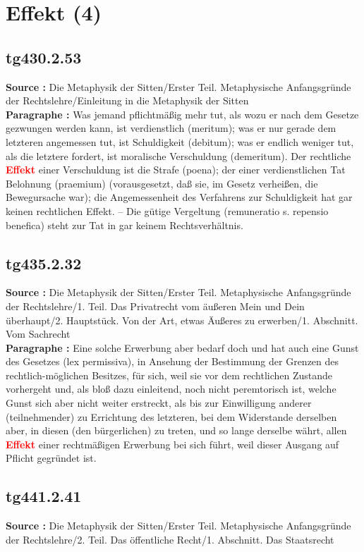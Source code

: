 \documentclass[a4paper,12pt,twoside]{book}
\newcommand{\match}[1]{\textcolor{red}{\textbf{#1}}}
\newcommand{\unnumberedsection}[1]{
	\section*{#1}
	\addcontentsline{toc}{section}{#1}
	\markright{#1}
}
\begin{document}
	\unnumberedsection{Effekt (4)} 
	\subsection*{tg430.2.53} 
	\textbf{Source : }Die Metaphysik der Sitten/Erster Teil. Metaphysische Anfangsgründe der Rechtslehre/Einleitung in die Metaphysik der Sitten\\  
	
	\textbf{Paragraphe : }Was jemand pflichtmäßig mehr tut, als wozu er nach dem Gesetze gezwungen werden kann, ist verdienstlich (meritum); was er nur gerade dem letzteren angemessen tut, ist Schuldigkeit (debitum); was er endlich weniger tut, als die letztere fordert, ist moralische Verschuldung (demeritum). Der rechtliche \match{Effekt} einer Verschuldung ist die Strafe (poena); der einer verdienstlichen Tat Belohnung (praemium) (vorausgesetzt, daß sie, im Gesetz verheißen, die Bewegursache war); die Angemessenheit des Verfahrens zur Schuldigkeit hat gar keinen rechtlichen Effekt. – Die gütige Vergeltung (remuneratio s. repensio benefica) steht zur Tat in gar keinem Rechtsverhältnis. 
	
	\subsection*{tg435.2.32} 
	\textbf{Source : }Die Metaphysik der Sitten/Erster Teil. Metaphysische Anfangsgründe der Rechtslehre/1. Teil. Das Privatrecht vom äußeren Mein und Dein überhaupt/2. Hauptstück. Von der Art, etwas Äußeres zu erwerben/1. Abschnitt. Vom Sachrecht\\  
	
	\textbf{Paragraphe : }Eine solche Erwerbung aber bedarf doch und hat auch eine Gunst des Gesetzes (lex permissiva), in Ansehung der Bestimmung der Grenzen des rechtlich-möglichen Besitzes, für sich, weil sie vor dem rechtlichen Zustande vorhergeht und, als bloß dazu einleitend, noch nicht peremtorisch ist, welche Gunst sich aber nicht weiter erstreckt, als bis zur  Einwilligung anderer (teilnehmender) zu Errichtung des letzteren, bei dem Widerstande derselben aber, in diesen (den bürgerlichen) zu treten, und so lange derselbe währt, allen \match{Effekt} einer rechtmäßigen Erwerbung bei sich führt, weil dieser Ausgang auf Pflicht gegründet ist. 
	
	\subsection*{tg441.2.41} 
	\textbf{Source : }Die Metaphysik der Sitten/Erster Teil. Metaphysische Anfangsgründe der Rechtslehre/2. Teil. Das öffentliche Recht/1. Abschnitt. Das Staatsrecht\\  
	
\end{document}
